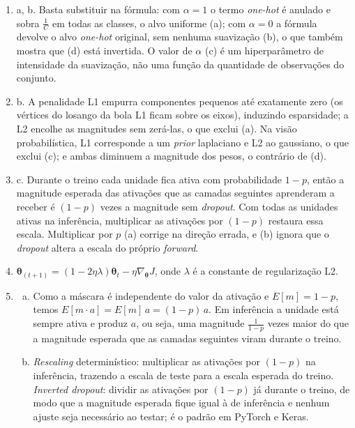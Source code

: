 \documentclass{dlproblemset}
\begin{document}
\begin{enumerate}[1)]
    \item a, b. Basta substituir na fórmula: com $\alpha=1$ o termo \textit{one-hot} é anulado e sobra $\frac{1}{C}$ em todas as classes, o alvo uniforme (a); com $\alpha=0$ a fórmula devolve o alvo \textit{one-hot} original, sem nenhuma suavização (b), o que também mostra que (d) está invertida. O valor de $\alpha$ (c) é um hiperparâmetro de intensidade da suavização, não uma função da quantidade de observações do conjunto.

    \item b. A penalidade L1 empurra componentes pequenos até exatamente zero (os vértices do losango da bola L1 ficam sobre os eixos), induzindo esparsidade; a L2 encolhe as magnitudes sem zerá-las, o que exclui (a). Na visão probabilística, L1 corresponde a um \textit{prior} laplaciano e L2 ao gaussiano, o que exclui (c); e ambas diminuem a magnitude dos pesos, o contrário de (d).

    \item c. Durante o treino cada unidade fica ativa com probabilidade $1-p$, então a magnitude esperada das ativações que as camadas seguintes aprenderam a receber é $(1-p)$ vezes a magnitude sem \textit{dropout}. Com todas as unidades ativas na inferência, multiplicar as ativações por $(1-p)$ restaura essa escala. Multiplicar por $p$ (a) corrige na direção errada, e (b) ignora que o \textit{dropout} altera a escala do próprio \textit{forward}.

    \item $\boldsymbol{\theta}_{(t+1)}=(1 - 2\eta \lambda)\boldsymbol{\theta}_t - \eta\nabla_{\boldsymbol{\theta}} J$, onde $\lambda$ é a constante de regularização L2.

    \item
    \begin{enumerate}[a)]
        \item Como a máscara é independente do valor da ativação e $E[m] = 1-p$, temos $E[m \cdot a] = E[m]\,a = (1-p)\,a$. Em inferência a unidade está sempre ativa e produz $a$, ou seja, uma magnitude $\frac{1}{1-p}$ vezes maior do que a magnitude esperada que as camadas seguintes viram durante o treino.
        \item \textit{Rescaling} determinístico: multiplicar as ativações por $(1-p)$ na inferência, trazendo a escala de teste para a escala esperada do treino. \textit{Inverted dropout}: dividir as ativações por $(1-p)$ já durante o treino, de modo que a magnitude esperada fique igual à de inferência e nenhum ajuste seja necessário ao testar; é o padrão em PyTorch e Keras.
    \end{enumerate}


\end{enumerate}
\end{document}
